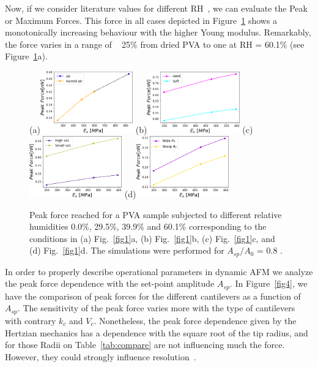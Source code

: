 \documentclass[letterpaper,compsoc,twoside]{IEEEtran}
\begin{document}
Now, if we consider literature values for different RH~\cite{Modul1, Modul2}, we can evaluate the Peak or Maximum Forces. This force in all cases depicted in Figure~\ref{fig3} shows a monotonically increasing behaviour with the higher Young modulus. Remarkably, the force varies in a range of ~ 25\% from dried PVA to one at RH = 60.1\% (see Figure~\ref{fig3}a).
\begin{figure}[H]
\centering
\subfigure(a){\includegraphics[width=40mm]{fig3a.png}}
\subfigure(b){\includegraphics[width=40mm]{fig3b.png}}
\subfigure(c){\includegraphics[width=40mm]{fig3c.png}}
\subfigure(d){\includegraphics[width=40mm]{fig3d.png}}
\caption{Peak force reached for a PVA sample subjected to different relative humidities 0.0\%, 29.5\%, 39.9\% and 60.1\% corresponding to the conditions in (a) Fig.~\ref{fig1}a, (b) Fig.~\ref{fig1}b, (c) Fig.~\ref{fig1}c, and (d) Fig.~\ref{fig1}d. The simulations were performed for $A_{sp}/A_{0}$ = 0.8 .}\label{fig3}
\end{figure}

In order to properly describe operational parameters in dynamic AFM we analyze the peak force dependence with the set-point amplitude $A_{sp}$. In Figure~\ref{fig4}, we have the comparison of peak forces for the different cantilevers as a function of $A_{sp}$. The sensitivity of the peak force varies more with the type of cantilevers with contrary $k_c$ and $V_c$. Nonetheless, the peak force dependence given by the Hertzian mechanics has a dependence with the square root of the tip radius, and for those Radii on Table~\ref{tab:compare} are not influencing much the force. However, they could strongly influence resolution~\cite{GuzmanScalingBJON2013}.
\end{document}
